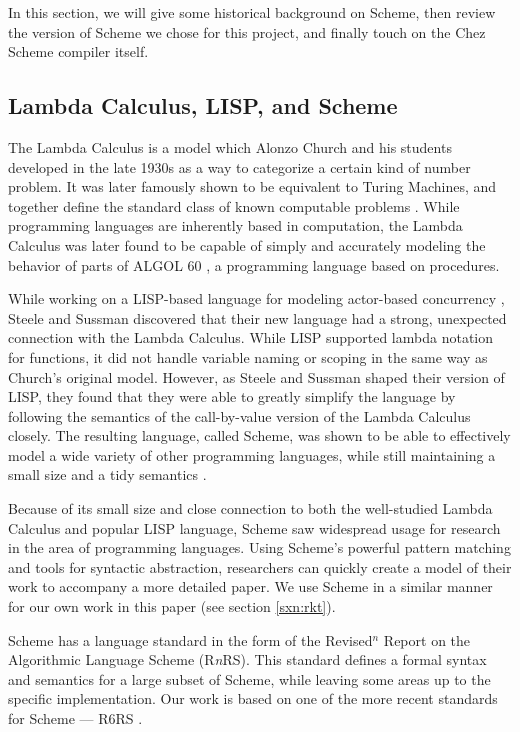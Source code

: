 In this section, we will give some historical background on Scheme, then review the version of Scheme we chose for this project, and finally touch on the Chez Scheme compiler itself.
\subsection{Lambda Calculus, LISP, and Scheme}
The Lambda Calculus is a model which Alonzo Church and his students developed in the late 1930s \cite{church1936unsolvable} as a way to categorize a certain kind of number problem. It was later famously shown to be equivalent to Turing Machines, and together define the standard class of known computable problems \cite{sep-church-turing}. While programming languages are inherently based in computation, the Lambda Calculus was later found to be capable of simply and accurately modeling the behavior of parts of ALGOL 60 \cite{landin1965correspondence}, a programming language based on procedures.

While working on a LISP-based language for modeling actor-based concurrency \cite{sussman_first_1998}, Steele and Sussman discovered that their new language had a strong, unexpected connection with the Lambda Calculus. While LISP supported lambda notation for functions, it did not handle variable naming or scoping in the same way as Church's original model. However, as Steele and Sussman shaped their version of LISP, they found that they were able to greatly simplify the language by following the semantics of the call-by-value version of the Lambda Calculus closely. The resulting language, called Scheme, was shown to be able to effectively model a wide variety of other programming languages, while still maintaining a small size and a tidy semantics \cite{steele1978revised}. 

Because of its small size and close connection to both the well-studied Lambda Calculus and popular LISP language, Scheme saw widespread usage for research in the area of programming languages. Using Scheme's powerful pattern matching and tools for syntactic abstraction, researchers can quickly create a model of their work to accompany a more detailed paper. We use Scheme in a similar manner for our own work in this paper (see section \ref{sxn:rkt}).

Scheme has a language standard in the form of the Revised$^n$ Report on the Algorithmic Language Scheme (R\textit{n}RS). This standard defines a formal syntax and semantics for a large subset of Scheme, while leaving some areas up to the specific implementation. Our work is based on one of the more recent standards for Scheme --- R6RS \cite{sperber_revised6_2009}.

